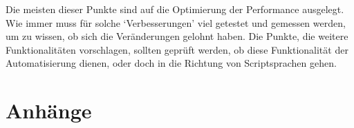     Die meisten dieser Punkte sind auf die Optimierung der Performance ausgelegt. Wie immer muss für solche `Verbesserungen' viel getestet und gemessen werden, um zu wissen, ob sich die Veränderungen gelohnt haben. Die Punkte, die weitere Funktionalitäten vorschlagen, sollten geprüft werden, ob diese Funktionalität der Automatisierung dienen, oder doch in die Richtung von Scriptsprachen gehen.


\label{sec:Literaturverzeichnis}
\begingroup
\sloppy
\printbibliography[title={Literaturverzeichnis}, heading=bibintoc]
\endgroup
\listoffigures
\listofmyCodeEnvTypes
{} %

\section*{Anhänge}
\label{sec:Anhänge}


